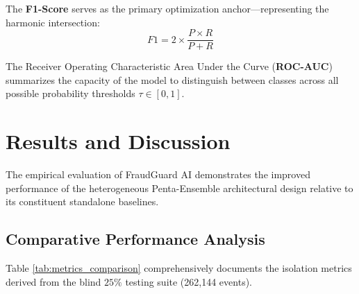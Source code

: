 \documentclass[conference]{IEEEtran}
\begin{document}
The \textbf{F1-Score} serves as the primary optimization anchor—representing the harmonic intersection:
\begin{equation}
    F1 = 2 \times \frac{P \times R}{P + R}
\end{equation}

The Receiver Operating Characteristic Area Under the Curve (\textbf{ROC-AUC}) summarizes the capacity of the model to distinguish between classes across all possible probability thresholds $\tau \in [0, 1]$.

\section{Results and Discussion}
\label{sec:results}

The empirical evaluation of FraudGuard AI demonstrates the improved performance of the heterogeneous Penta-Ensemble architectural design relative to its constituent standalone baselines.

\subsection{Comparative Performance Analysis}
Table \ref{tab:metrics_comparison} comprehensively documents the isolation metrics derived from the blind $25\%$ testing suite (262,144 events).

\begin{table}[htbp]
\caption{Comprehensive Evaluation of Component Algorithms vs. Unified Penta-Ensemble on Blind Test Dataset}
\label{tab:metrics_comparison}
\centering
{}
\end{table}
\end{document}
